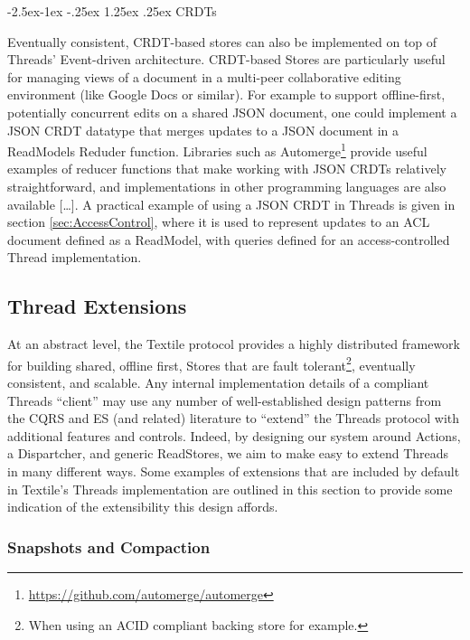 \documentclass{textile}
\makeatletter
\renewcommand\paragraph{\@startsection{paragraph}{4}{\z@}%
            {-2.5ex\@plus -1ex \@minus -.25ex}%
            {1.25ex \@plus .25ex}%
            {\normalfont\normalsize\itshape}}
\makeatother
\begin{document}
\paragraph{CRDTs} \label{sec:TexCRDT}

Eventually consistent, CRDT-based stores can also be implemented on top of Threads' Event-driven architecture. CRDT-based Stores are particularly useful for managing views of a document in a multi-peer collaborative editing environment (like Google Docs or similar). For example to support offline-first, potentially concurrent edits on a shared JSON document, one could implement a JSON CRDT datatype \cite{kleppmannConflictFreeReplicatedJSON2017} that merges updates to a JSON document in a ReadModels Reduder function. Libraries such as Automerge\footnote{\url{https://github.com/automerge/automerge}} provide useful examples of reducer functions that make working with JSON CRDTs relatively straightforward, and implementations in other programming languages are also available [\dots]. A practical example of using a JSON CRDT in Threads is given in section \ref{sec:AccessControl}, where it is used to represent updates to an ACL document defined as a ReadModel, with queries defined for an access-controlled Thread implementation.

\subsection{Thread Extensions}

At an abstract level, the Textile protocol provides a highly distributed framework for building shared, offline first, Stores that are fault tolerant\footnote{When using an ACID compliant backing store for example.}, eventually consistent, and scalable. Any internal implementation details of a compliant Threads ``client'' may use any number of well-established design patterns from the CQRS and ES (and related) literature to ``extend'' the Threads protocol with additional features and controls. Indeed, by designing our system around Actions, a Dispartcher, and generic ReadStores, we aim to make easy to extend Threads in many different ways. Some examples of extensions that are included by default in Textile's Threads implementation are outlined in this section to provide some indication of the extensibility this design affords.

\subsubsection{Snapshots and Compaction}\label{sec:SnapshotsCompaction}
\end{document}
